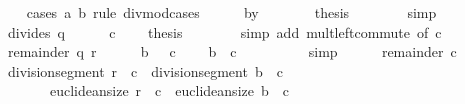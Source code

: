 \begin{isabellebody}
\ \ \isamarkupfalse%
\ {\isacharparenleft}{\kern0pt}cases\ a\ b\ rule{\isacharcolon}{\kern0pt}\ divmod{\isacharunderscore}{\kern0pt}cases{\isacharparenright}{\kern0pt}\isanewline
\ \ \ \ \isamarkupfalse%
\ by{}\isanewline
\ \ \ \ \isamarkupfalse%
\ \isamarkupfalse%
\ {\isacharquery}{\kern0pt}thesis\isanewline
\ \ \ \ \ \ \isamarkupfalse%
\ simp\isanewline
\ \ \isamarkupfalse%
\isanewline
\ \ \ \ \isamarkupfalse%
\ {\isacharparenleft}{\kern0pt}divides\ q{\isacharparenright}{\kern0pt}\isanewline
\ \ \ \ \isamarkupfalse%
\ {\isacartoucheopen}c\ {\isasymnoteq}\ {}{\isacartoucheclose}\ \isamarkupfalse%
\ {\isacharquery}{\kern0pt}thesis\isanewline
\ \ \ \ \ \ \isamarkupfalse%
\ {\isacharparenleft}{\kern0pt}simp\ add{\isacharcolon}{\kern0pt}\ mult{\isachardot}{\kern0pt}left{\isacharunderscore}{\kern0pt}commute\ {\isacharbrackleft}{\kern0pt}of\ c{\isacharbrackright}{\kern0pt}{\isacharparenright}{\kern0pt}\isanewline
\ \ \isamarkupfalse%
\isanewline
\ \ \ \ \isamarkupfalse%
\ {\isacharparenleft}{\kern0pt}remainder\ q\ r{\isacharparenright}{\kern0pt}\isanewline
\ \ \ \ \isamarkupfalse%
\ {\isacartoucheopen}b\ {\isasymnoteq}\ {}{\isacartoucheclose}\ {\isacartoucheopen}c\ {\isasymnoteq}\ {}{\isacartoucheclose}\ \isamarkupfalse%
\ {\isachardoublequoteopen}b\ {\isacharasterisk}{\kern0pt}\ c\ {\isasymnoteq}\ {}{\isachardoublequoteclose}\isanewline
\ \ \ \ \ \ \isamarkupfalse%
\ simp\isanewline
\ \ \ \ \isamarkupfalse%
\ remainder\ {\isacartoucheopen}c\ {\isasymnoteq}\ {}{\isacartoucheclose}\isanewline
\ \ \ \ \isamarkupfalse%
\ {\isachardoublequoteopen}division{\isacharunderscore}{\kern0pt}segment\ {\isacharparenleft}{\kern0pt}r\ {\isacharasterisk}{\kern0pt}\ c{\isacharparenright}{\kern0pt}\ {\isacharequal}{\kern0pt}\ division{\isacharunderscore}{\kern0pt}segment\ {\isacharparenleft}{\kern0pt}b\ {\isacharasterisk}{\kern0pt}\ c{\isacharparenright}{\kern0pt}{\isachardoublequoteclose}\isanewline
\ \ \ \ \ \ \ {\isachardoublequoteopen}euclidean{\isacharunderscore}{\kern0pt}size\ {\isacharparenleft}{\kern0pt}r\ {\isacharasterisk}{\kern0pt}\ c{\isacharparenright}{\kern0pt}\ {\isacharless}{\kern0pt}\ euclidean{\isacharunderscore}{\kern0pt}size\ {\isacharparenleft}{\kern0pt}b\ {\isacharasterisk}{\kern0pt}\ c{\isacharparenright}{\kern0pt}{\isachardoublequoteclose}\isanewline

\end{isabellebody}
